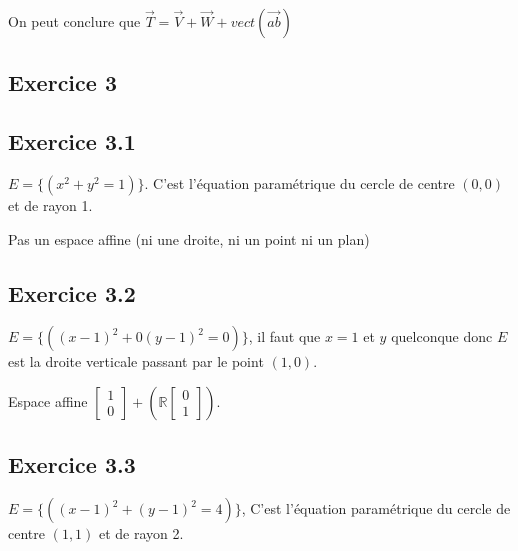 \documentclass[]{book}
\theoremstyle{definition}
\newcommand{\bb}[1]{\mathbb{#1}}
\newcommand{\R}{\bb{R}}
\begin{document}
On peut conclure que $\overrightarrow{T} = \overrightarrow{V} + \overrightarrow{W} + vect(\overrightarrow{ab})$


\subsection*{Exercice 3}
\subsection*{Exercice 3.1}
$E= \{ (x^2 + y^2 = 1)\}$. C'est l'\'equation param\'etrique du cercle de centre $(0,0)$ et de rayon 1.


Pas un espace affine (ni une droite, ni un point ni un plan)

\subsection*{Exercice 3.2}
$E= \{ ((x-1)^2 + 0(y-1)^2 = 0)\}$, il faut que $x=1$ et $y$ quelconque donc $E$ est la droite verticale passant par le point $(1,0)$.

Espace affine $\begin{bmatrix} 1 \\ 0 \end{bmatrix} + (\R \begin{bmatrix} 0 \\ 1 \end{bmatrix})$.

\subsection*{Exercice 3.3}
$E= \{ ((x-1)^2 + (y-1)^2 = 4)\}$, C'est l'\'equation param\'etrique du cercle de centre $(1,1)$ et de rayon 2.
\end{document}
